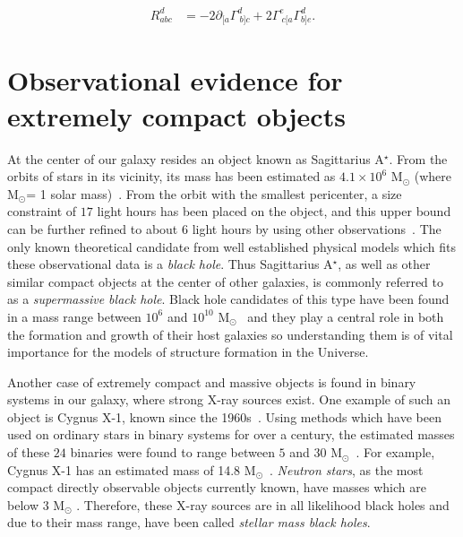 \begin{align*}
  R_{abc}^d &= -2\partial_{[a}\Gamma^d_{~b]c} + 2\Gamma^e_{~c[a}\Gamma^d_{b]e}.
\end{align*}


\section{Observational evidence for extremely compact objects}

At the center of our galaxy resides an object known as Sagittarius A$^\star$.
From the orbits of stars in its vicinity, its mass has been estimated as $4.1\times 10^6$ M$_\odot$ (where M$_\odot$= 1 solar mass)~\cite{Ghez:2008ms}.
From the orbit with the smallest pericenter, a size constraint of $17$ light hours has been placed on the object, and this upper bound can be further refined to about $6$ light hours by using other observations~\cite{Ghez:2003qj}.
The only known theoretical candidate from well established physical models which fits these observational data is a \textit{black hole}.
Thus Sagittarius A$^\star$, as well as other similar compact objects at the center of other galaxies, is commonly referred to as a \emph{supermassive black hole}.
Black hole candidates of this type have been found in a mass range between $10^6$ and $10^{10}$ M$_\odot$~\cite{Narayan:2013gca} and they play a central role in both the formation and growth of their host galaxies \cite{Kormendy:2013pja} so understanding them is of vital importance for the models of structure formation in the Universe.

Another case of extremely compact and massive objects is found in binary systems in our galaxy, where strong X-ray sources exist.
One example of such an object is Cygnus X-1, known since the 1960s~\cite{1965Sci...147..394B}.
Using methods which have been used on ordinary stars in binary systems for over a century, the estimated masses of these $24$ binaries were found to range between $5$ and $30$ M$_\odot$~\cite{Narayan:2013gca}.
For example, Cygnus X-1 has an estimated mass of 14.8 M$_\odot$~\cite{Reid:2011nn}.
\textit{Neutron stars}, as the most compact directly observable objects currently known, have masses which are below $3$ M$_\odot$ \cite{Kalogera:1996ci,Rhoades:1974fn}.
Therefore, these X-ray sources are in all likelihood black holes and due to their mass range, have been called \textit{stellar mass black holes}.

